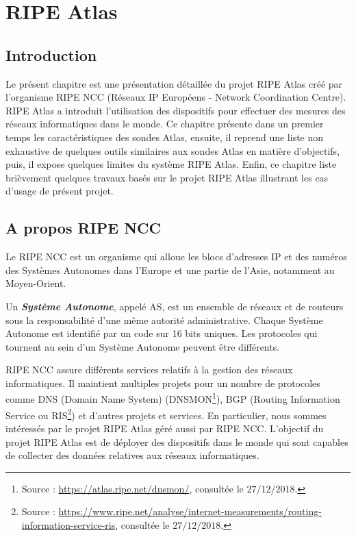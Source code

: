 
\chapter{RIPE Atlas}

\section{Introduction}



Le présent chapitre est une présentation détaillée du projet RIPE Atlas créé par l'organisme RIPE NCC (Réseaux IP Européens - Network Coordination Centre).  RIPE Atlas  a introduit l'utilisation des dispositifs pour  effectuer des mesures des réseaux informatiques dans le monde. Ce chapitre présente dans un premier temps les caractéristiques des sondes Atlas, ensuite, il  reprend une liste non exhaustive  de quelques outils similaires aux sondes Atlas en matière d'objectifs, puis, il expose quelques limites du système RIPE Atlas. Enfin, ce chapitre  liste  brièvement quelques travaux basés sur le projet RIPE Atlas illustrant les cas d'usage de présent projet.


\section{A propos RIPE NCC}
Le RIPE NCC  est un organisme qui alloue les blocs d'adresses IP et des numéros des Systèmes Autonomes dans l'Europe et une partie de l'Asie, notamment au Moyen-Orient. 

\begin{tcolorbox}
	Un\textit{ \textbf{Système Autonome}}, appelé AS, est un ensemble de réseaux et de routeurs sous la responsabilité d'une même autorité administrative. Chaque Système Autonome est identifié par un code sur 16 bits uniques. Les protocoles qui tournent au sein d'un Système Autonome peuvent être différents.
\end{tcolorbox}

RIPE NCC assure différents services relatifs à la gestion des réseaux informatiques. Il maintient multiples projets  pour un nombre de protocoles comme DNS (Domain Name System)  (DNSMON\footnote{Source : \url{https://atlas.ripe.net/dnsmon/}, consultée le $27/12/2018$.}), BGP (Routing Information Service ou RIS\footnote{Source : \url{https://www.ripe.net/analyse/internet-measurements/routing-information-service-ris}, consultée le $27/12/2018$.}) et d'autres projets et services. En particulier, nous sommes intéressés  par le projet RIPE Atlas géré aussi par RIPE NCC. L'objectif du projet RIPE Atlas est de déployer des dispositifs dans le monde qui sont capables de collecter des données relatives aux réseaux informatiques. %


